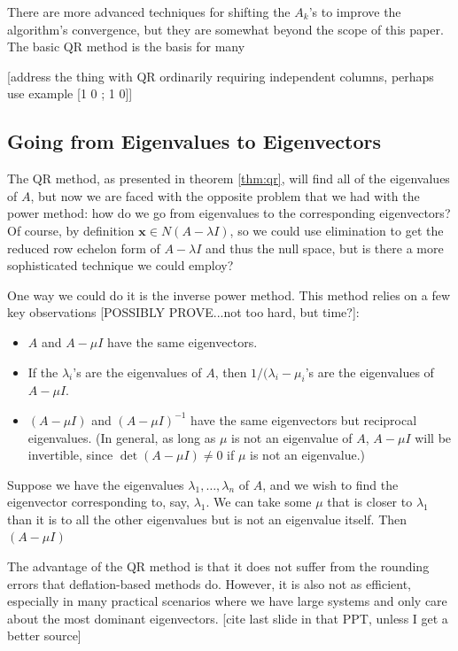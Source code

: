 \documentclass{article}
\let\vec\mathbf
\begin{document}
There are more advanced techniques for shifting the $A_k$'s to improve the algorithm's convergence, but they are somewhat beyond the scope of this paper. The basic QR method is the basis for many

[address the thing with QR ordinarily requiring independent columns, perhaps use example [1 0 ; 1 0]]

\subsection{Going from Eigenvalues to Eigenvectors}
The QR method, as presented in theorem \ref{thm:qr}, will find all of the eigenvalues of $A$, but now we are faced with the opposite problem that we had with the power method: how do we go from eigenvalues to the corresponding eigenvectors? Of course, by definition $\vec{x} \in N(A - \lambda I)$, so we could use elimination to get the reduced row echelon form of $A - \lambda I$ and thus the null space, but is there a more sophisticated technique we could employ?

One way we could do it is the inverse power method. This method relies on a few key observations [POSSIBLY PROVE...not too hard, but time?]:
\begin{itemize}
  \item $A$ and $A - \mu I$ have the same eigenvectors.
  \item If the $\lambda_i$'s are the eigenvalues of $A$, then $1/(\lambda_i - \mu_i$'s are the eigenvalues of $A - \mu I$.
  \item $(A - \mu I)$ and $(A - \mu I)^{-1}$ have the same eigenvectors but reciprocal eigenvalues. (In general, as long as $\mu$ is not an eigenvalue of $A$, $A - \mu I$ will be invertible, since $\det(A - \mu I) \neq 0$ if $\mu$ is not an eigenvalue.)
\end{itemize}
Suppose we have the eigenvalues $\lambda_1, \ldots, \lambda_n$ of $A$, and we wish to find the eigenvector corresponding to, say, $\lambda_1$. We can take some $\mu$ that is closer to $\lambda_1$ than it is to all the other eigenvalues but is not an eigenvalue itself. Then $(A - \mu I)$

The advantage of the QR method is that it does not suffer from the rounding errors that deflation-based methods do. However, it is also not as efficient, especially in many practical scenarios where we have large systems and only care about the most dominant eigenvectors. [cite last slide in that PPT, unless I get a better source]
\end{document}
